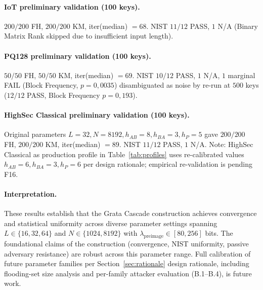 \documentclass[11pt,a4paper]{article}
\begin{document}
\paragraph{IoT preliminary validation (100 keys).}
$200/200$ FH, $200/200$ KM, iter(median) $= 68$. NIST $11/12$ PASS, $1$ N/A (Binary Matrix Rank skipped due to insufficient input length).

\paragraph{PQ128 preliminary validation (100 keys).}
$50/50$ FH, $50/50$ KM, iter(median) $= 69$. NIST $10/12$ PASS, $1$ N/A, $1$ marginal FAIL (Block Frequency, $p = 0{,}0035$) disambiguated as noise by re-run at $500$ keys ($12/12$ PASS, Block Frequency $p = 0{,}193$).

\paragraph{HighSec Classical preliminary validation (100 keys).}
Original parameters $L = 32, N = 8192, h_{AB} = 8, h_{BA} = 3, h_P = 5$ gave $200/200$ FH, $200/200$ KM, iter(median) $= 89$. NIST $11/12$ PASS, $1$ N/A. Note: HighSec Classical as production profile in Table~\ref{tab:profiles} uses re-calibrated values $h_{AB} = 6, h_{BA} = 3, h_P = 6$ per design rationale; empirical re-validation is pending F16.

\paragraph{Interpretation.} These results establish that the Grata Cascade construction achieves convergence and statistical uniformity across diverse parameter settings spanning $L \in \{16, 32, 64\}$ and $N \in \{1024, 8192\}$ with $\lambda_\text{preimage} \in [80, 256]$ bits. The foundational claims of the construction (convergence, NIST uniformity, passive adversary resistance) are robust across this parameter range. Full calibration of future parameter families per Section~\ref{sec:rationale} design rationale, including flooding-set size analysis and per-family attacker evaluation (B.1--B.4), is future work.

\bigskip

\end{document}
